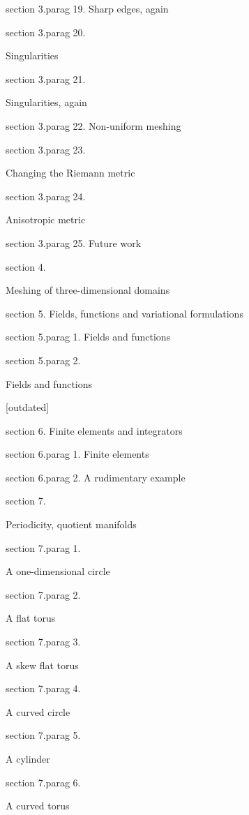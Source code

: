 \numb section 3.\numb parag 19. Sharp edges, again

\numb section 3.\numb parag 20.
Singularities

\numb section 3.\numb parag 21.
Singularities, again

\numb section 3.\numb parag 22. Non-uniform meshing

\numb section 3.\numb parag 23. 
Changing the Riemann metric

\numb section 3.\numb parag 24. 
Anisotropic metric

\numb section 3.\numb parag 25. Future work

\medskip\noindent
\numb section 4. Meshing of three-dimensional domains

\medskip\noindent
\numb section 5. Fields, functions and variational formulations

\numb section 5.\numb parag 1. Fields and functions

\numb section 5.\numb parag 2. Fields and functions [outdated]


\medskip\noindent
\numb section 6. Finite elements and integrators

\numb section 6.\numb parag 1. Finite elements

\numb section 6.\numb parag 2. A rudimentary example


\medskip\noindent
\numb section 7. Periodicity, quotient manifolds

\numb section 7.\numb parag 1. A one-dimensional circle

\numb section 7.\numb parag 2. A flat torus

\numb section 7.\numb parag 3. A skew flat torus

\numb section 7.\numb parag 4. A curved circle

\numb section 7.\numb parag 5. A cylinder

\numb section 7.\numb parag 6. A curved torus


